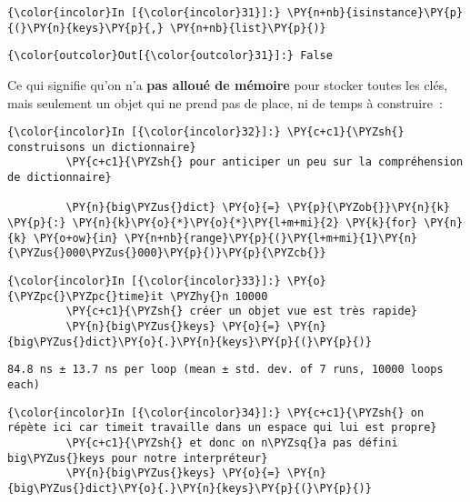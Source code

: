     \begin{Verbatim}[commandchars=\\\{\}]
{\color{incolor}In [{\color{incolor}31}]:} \PY{n+nb}{isinstance}\PY{p}{(}\PY{n}{keys}\PY{p}{,} \PY{n+nb}{list}\PY{p}{)}
\end{Verbatim}


\begin{Verbatim}[commandchars=\\\{\}]
{\color{outcolor}Out[{\color{outcolor}31}]:} False
\end{Verbatim}
            
    Ce qui signifie qu'on n'a \textbf{pas alloué de mémoire} pour stocker
toutes les clés, mais seulement un objet qui ne prend pas de place, ni
de temps à construire~:

    \begin{Verbatim}[commandchars=\\\{\}]
{\color{incolor}In [{\color{incolor}32}]:} \PY{c+c1}{\PYZsh{} construisons un dictionnaire}
         \PY{c+c1}{\PYZsh{} pour anticiper un peu sur la compréhension de dictionnaire}
         
         \PY{n}{big\PYZus{}dict} \PY{o}{=} \PY{p}{\PYZob{}}\PY{n}{k} \PY{p}{:} \PY{n}{k}\PY{o}{*}\PY{o}{*}\PY{l+m+mi}{2} \PY{k}{for} \PY{n}{k} \PY{o+ow}{in} \PY{n+nb}{range}\PY{p}{(}\PY{l+m+mi}{1}\PY{n}{\PYZus{}000\PYZus{}000}\PY{p}{)}\PY{p}{\PYZcb{}}
\end{Verbatim}


    \begin{Verbatim}[commandchars=\\\{\}]
{\color{incolor}In [{\color{incolor}33}]:} \PY{o}{\PYZpc{}\PYZpc{}time}it \PYZhy{}n 10000
         \PY{c+c1}{\PYZsh{} créer un objet vue est très rapide}
         \PY{n}{big\PYZus{}keys} \PY{o}{=} \PY{n}{big\PYZus{}dict}\PY{o}{.}\PY{n}{keys}\PY{p}{(}\PY{p}{)}
\end{Verbatim}


    \begin{Verbatim}[commandchars=\\\{\}]
84.8 ns ± 13.7 ns per loop (mean ± std. dev. of 7 runs, 10000 loops each)

    \end{Verbatim}

    \begin{Verbatim}[commandchars=\\\{\}]
{\color{incolor}In [{\color{incolor}34}]:} \PY{c+c1}{\PYZsh{} on répète ici car timeit travaille dans un espace qui lui est propre}
         \PY{c+c1}{\PYZsh{} et donc on n\PYZsq{}a pas défini big\PYZus{}keys pour notre interpréteur}
         \PY{n}{big\PYZus{}keys} \PY{o}{=} \PY{n}{big\PYZus{}dict}\PY{o}{.}\PY{n}{keys}\PY{p}{(}\PY{p}{)}
\end{Verbatim}


